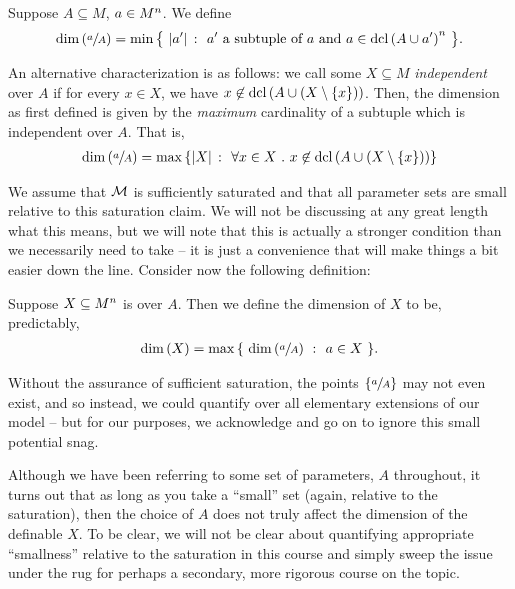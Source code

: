 Suppose $A \subseteq M$, $\aMn[a]{n}$. We define
  \begin{align*}
    \dim{\sfrac{a}{A}} = \min{ \left\{ \ \card{\pri{a}} \ \colon \ \pri{a} \textrm{ a subtuple of } a \textrm{ and } a \in \dcl{A \cup \pri{a}}^n \ \right\} }.
  \end{align*}

An alternative characterization is as follows: we call some $X \subseteq M$ \emph{independent} over $A$ if for every $x \in X$, we have $x \not\in \dcl{A \cup (X \setminus \{ x \})}$. Then, the dimension as first defined is given by the \emph{maximum} cardinality of a subtuple which is independent over $A$. That is,
  \begin{align*}
    \dim{ \sfrac{a}{A} } = \max{ \left\{ \card{X} \ \colon \ \forall x \in X \ . \ x \not\in \dcl{A \cup (X \setminus \{ x \})} \right\} }
  \end{align*}

We assume that $\M$ is sufficiently saturated and that all parameter sets are small relative to this saturation claim. We will not be discussing at any great length what this means, but we will note that this is actually a stronger condition than we necessarily need to take -- it is just a convenience that will make things a bit easier down the line. Consider now the following definition:

\begin{definition}
  Suppose $\XMn[X]{n}$ is  over $A$. Then we define the dimension of $X$ to be, predictably,
    \begin{align*}
      \dim{X} = \max{ \left\{ \ \dim{\sfrac{a}{A}} \ \colon \ a \in X \ \right\} }.
    \end{align*}
    \label{defn:alg_dim}
\end{definition}

\begin{remark}
  Without the assurance of sufficient saturation, the points $\left\{ \sfrac{a}{A} \right\}$ may not even exist, and so instead, we could quantify over all elementary extensions of our model -- but for our purposes, we acknowledge and go on to ignore this small potential snag.
\end{remark}

Although we have been referring to some set of parameters, $A$ throughout, it turns out that as long as you take a ``small'' set (again, relative to the saturation), then the choice of $A$ does not truly affect the dimension of the definable $X$. To be clear, we will not be clear about quantifying appropriate ``smallness'' relative to the saturation in this course and simply sweep the issue under the rug for perhaps a secondary, more rigorous course on the topic.

